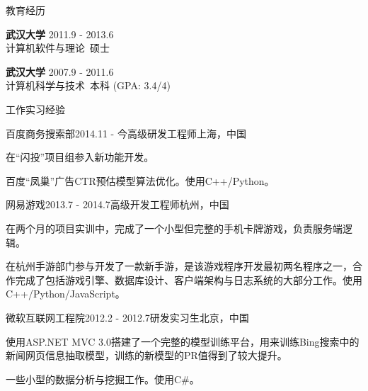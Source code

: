 \documentclass{resume} %
\begin{document}
\begin{rSection}{教育经历}

{\bf 武汉大学} \hfill {2011.9 - 2013.6} \\
计算机软件与理论\ 硕士

{\bf 武汉大学} \hfill {2007.9 - 2011.6} \\
计算机科学与技术\ 本科 (GPA: 3.4/4)
\vspace{0.5em}

\end{rSection}

\begin{rSection}{工作实习经验}

\begin{rSubsection}{百度商务搜索部}{2014.11 - 今}{高级研发工程师}{上海，中国}
\item 在“闪投”项目组参入新功能开发。
\item 百度“凤巢”广告CTR预估模型算法优化。使用C++/Python。
\end{rSubsection}
\begin{rSubsection}{网易游戏}{2013.7 - 2014.7}{高级开发工程师}{杭州，中国}
\item 在两个月的项目实训中，完成了一个小型但完整的手机卡牌游戏，负责服务端逻辑。
\item 在杭州手游部门参与开发了一款新手游，是该游戏程序开发最初两名程序之一，合作完成了包括游戏引擎、数据库设计、客户端架构与日志系统的大部分工作。使用C++/Python/JavaScript。
\end{rSubsection}
\begin{rSubsection}{微软互联网工程院}{2012.2 - 2012.7}{研发实习生}{北京，中国}
\item 使用ASP.NET MVC 3.0搭建了一个完整的模型训练平台，用来训练Bing搜索中的新闻网页信息抽取模型，训练的新模型的PR值得到了较大提升。
\item 一些小型的数据分析与挖掘工作。使用C\#。
\end{rSubsection}

\end{rSection}
\end{document}
